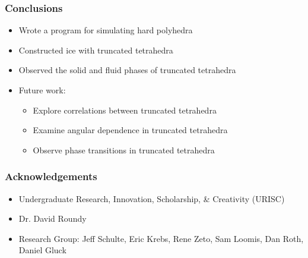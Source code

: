\documentclass[]{beamer}
\begin{document}
\begin{frame}
  \frametitle{Conclusions}
  \begin{itemize}\itemsep2ex
  \item Wrote a program for simulating hard polyhedra
  \item Constructed ice with truncated tetrahedra
  \item Observed the solid and fluid phases of truncated tetrahedra
  \item Future work:
    \begin{itemize}
    \item Explore correlations between truncated tetrahedra
    \item Examine angular dependence in truncated tetrahedra
    \item Observe phase transitions in truncated tetrahedra
    \end{itemize}

  \end{itemize}
\end{frame}

\begin{frame}
  \frametitle{Acknowledgements}
  \begin{itemize}\itemsep2ex
  \item Undergraduate Research, Innovation, Scholarship, \& Creativity (URISC)
  \item Dr. David Roundy
  \item Research Group: Jeff Schulte, Eric Krebs, Rene Zeto, Sam Loomis, Dan Roth, Daniel Gluck
  \end{itemize}
\end{frame}
\end{document}

